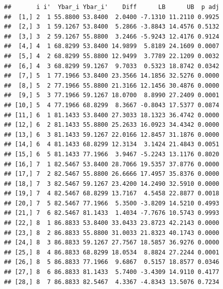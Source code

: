 \documentclass[
]{book}
\begin{document}
\begin{verbatim}
##       i i'  Ybar_i Ybar_i'    Diff      LB      UB  p adj
##  [1,] 2  1 55.8800 53.8400  2.0400 -7.1310 11.2110 0.9925
##  [2,] 3  1 59.1267 53.8400  5.2866 -3.8843 14.4576 0.5132
##  [3,] 3  2 59.1267 55.8800  3.2466 -5.9243 12.4176 0.9124
##  [4,] 4  1 68.8299 53.8400 14.9899  5.8189 24.1609 0.0007
##  [5,] 4  2 68.8299 55.8800 12.9499  3.7789 22.1209 0.0032
##  [6,] 4  3 68.8299 59.1267  9.7033  0.5323 18.8742 0.0342
##  [7,] 5  1 77.1966 53.8400 23.3566 14.1856 32.5276 0.0000
##  [8,] 5  2 77.1966 55.8800 21.3166 12.1456 30.4876 0.0000
##  [9,] 5  3 77.1966 59.1267 18.0700  8.8990 27.2409 0.0001
## [10,] 5  4 77.1966 68.8299  8.3667 -0.8043 17.5377 0.0874
## [11,] 6  1 81.1433 53.8400 27.3033 18.1323 36.4742 0.0000
## [12,] 6  2 81.1433 55.8800 25.2633 16.0923 34.4342 0.0000
## [13,] 6  3 81.1433 59.1267 22.0166 12.8457 31.1876 0.0000
## [14,] 6  4 81.1433 68.8299 12.3134  3.1424 21.4843 0.0051
## [15,] 6  5 81.1433 77.1966  3.9467 -5.2243 13.1176 0.8020
## [16,] 7  1 82.5467 53.8400 28.7066 19.5357 37.8776 0.0000
## [17,] 7  2 82.5467 55.8800 26.6666 17.4957 35.8376 0.0000
## [18,] 7  3 82.5467 59.1267 23.4200 14.2490 32.5910 0.0000
## [19,] 7  4 82.5467 68.8299 13.7167  4.5458 22.8877 0.0018
## [20,] 7  5 82.5467 77.1966  5.3500 -3.8209 14.5210 0.4993
## [21,] 7  6 82.5467 81.1433  1.4034 -7.7676 10.5743 0.9993
## [22,] 8  1 86.8833 53.8400 33.0433 23.8723 42.2143 0.0000
## [23,] 8  2 86.8833 55.8800 31.0033 21.8323 40.1743 0.0000
## [24,] 8  3 86.8833 59.1267 27.7567 18.5857 36.9276 0.0000
## [25,] 8  4 86.8833 68.8299 18.0534  8.8824 27.2244 0.0001
## [26,] 8  5 86.8833 77.1966  9.6867  0.5157 18.8577 0.0346
## [27,] 8  6 86.8833 81.1433  5.7400 -3.4309 14.9110 0.4177
## [28,] 8  7 86.8833 82.5467  4.3367 -4.8343 13.5076 0.7234
\end{verbatim}
\end{document}
